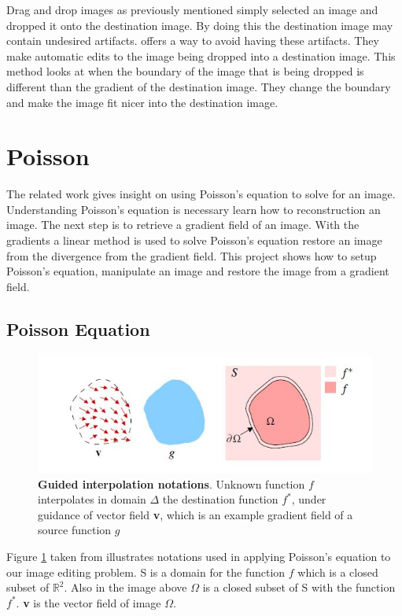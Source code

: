 \documentclass[10pt,twopage]{acmsiggraph}
\begin{document}
Drag and drop images as previously mentioned simply selected an image and dropped it onto the destination image. By doing this the destination image may contain undesired artifacts. \cite{ddp} offers a way to avoid having these artifacts. They make automatic edits to the image being dropped into a destination image. This method looks at when the boundary of the image that is being dropped is different than the gradient of the destination image. They change the boundary and make the image fit nicer into the destination image.

\section{Poisson}

The related work gives insight on using Poisson's equation to solve for an image. Understanding Poisson's equation is necessary learn how to reconstruction an image. The next step is to retrieve a gradient field of an image. With the gradients a linear method is used to solve Poisson's equation restore an image from the divergence from the gradient field. This project shows how to setup Poisson's equation, manipulate an image and restore the image from a gradient field.

\subsection{Poisson Equation}
\label{Poisson}

\begin{figure}[b]
\centering
\includegraphics[width=.44\textwidth]{fig/notations.jpg}
\caption{{\bf Guided interpolation notations}. Unknown function $f$ interpolates in domain \ensuremath{\Delta} the destination function $f^*$, under guidance of vector field {\bf v}, which is an example gradient field of a source function $g$}
\label{notations}
\end{figure}

Figure \ref{notations} taken from \cite{Perez} illustrates notations used in applying Poisson's equation to our image editing problem. S is a domain  for the function $f$ which is a closed subset of  \ensuremath{\mathbb{R}^2}. Also in the image above \ensuremath{\Omega} is a closed subset of S with the function $f^*$. {\bf v} is the vector field of image  \ensuremath{\Omega}. 
\end{document}
